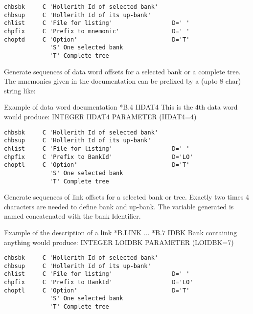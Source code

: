  
\begin{verbatim}
chbsbk     C 'Hollerith Id of selected bank'
chbsup     C 'Hollerith Id of its up-bank'
chlist     C 'File for listing'                 D=' '
chpfix     C 'Prefix to mnemonic'               D=' '
choptd     C 'Option'                           D='T'
             'S' One selected bank
             'T' Complete tree
\end{verbatim}
Generate sequences of data word offsets for a selected bank
or a complete tree. The mnemonics given in the documentation can be
prefixed by a (upto 8 char) string like: 
 
\begin{XMPt}{Example of data word documentation}
         *B.4 IIDAT4     This is the 4th data word
 {\rm would produce:}
         INTEGER IIDAT4
         PARAMETER (IIDAT4=4)
\end{XMPt}
 
 
\begin{verbatim}
chbsbk     C 'Hollerith Id of selected bank'
chbsup     C 'Hollerith Id of its up-bank'
chlist     C 'File for listing'                 D=' '
chpfix     C 'Prefix to BankId'                 D='LO'
choptl     C 'Option'                           D='T'
             'S' One selected bank
             'T' Complete tree
\end{verbatim}
 
Generate sequences of link offsets for a selected bank or tree.
Exactly two times 4 characters are needed to define bank and up-bank.
The variable generated is named  concatenated with the
bank Identifier.
 
\begin{XMPt}{Example of the description of a link}
         *B.LINK
         ...
         *B.7 IDBK  Bank containing anything
 {\rm would produce:}
         INTEGER LOIDBK
         PARAMETER (LOIDBK=7)
\end{XMPt}
 
 
\begin{verbatim}
chbsbk     C 'Hollerith Id of selected bank'
chbsup     C 'Hollerith Id of its up-bank'
chlist     C 'File for listing'                 D=' '
chpfix     C 'Prefix to BankId'                 D='LO'
choptl     C 'Option'                           D='T'
             'S' One selected bank
             'T' Complete tree
\end{verbatim}
 

